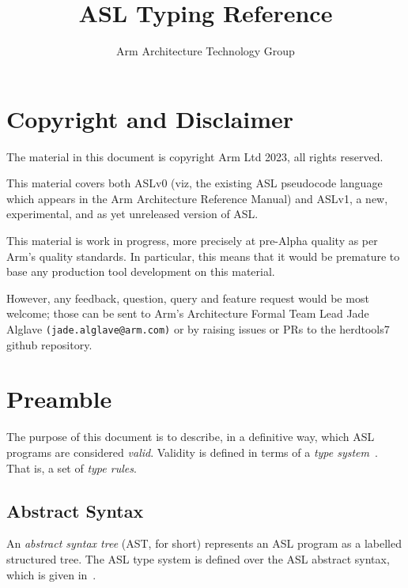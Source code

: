 \documentclass{book}
\author{Arm Architecture Technology Group}
\title{ASL Typing Reference}
\begin{document}
\maketitle

\tableofcontents{}

\chapter{Copyright and Disclaimer}

The material in this document is copyright Arm Ltd 2023, all rights reserved.

This material covers both ASLv0 (viz, the existing ASL pseudocode language
which appears in the Arm Architecture Reference Manual) and ASLv1, a new,
experimental, and as yet unreleased version of ASL.

This material is work in progress, more precisely at pre-Alpha quality as
per Arm’s quality standards. In particular, this means that it would be
premature to base any production tool development on this material.

However, any feedback, question, query and feature request would be most
welcome; those can be sent to Arm’s Architecture Formal Team Lead Jade
Alglave \texttt{(jade.alglave@arm.com)} or by raising issues or PRs to the herdtools7
github repository.

\chapter{Preamble}

The purpose of this document is to describe, in a definitive way, which ASL programs are considered \emph{valid}. Validity is defined in terms of a \emph{type system}~\cite{TypeSystemsLucaCardelli}. That is, a set of \emph{type rules}.

\section{Abstract Syntax}
An \emph{abstract syntax tree} (AST, for short) represents an ASL program as a labelled structured tree. 
%
The ASL type system is defined over the ASL abstract syntax, which is given in~\cite{ASLAbstractSyntaxReference}.
\end{document}
